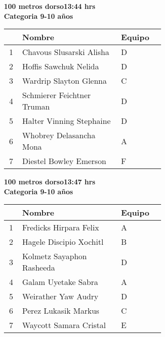 \begin{minipage}{0.95\linewidth}\vspace{0.5cm} 
\begin{flushleft}
\textbf{
\hspace{-0.15cm}100 metros dorso\hspace{1.5cm}13:44 hrs \\Categoria 9-10 años}\vspace{-0.2cm} 
\end{flushleft}
\begin{tabular}{cp{0.63\linewidth}l}
\hline
& \textbf{Nombre} & \textbf{Equipo} \\ \hline
1 & Chavous Slusarski Alisha & D \\ 
2 & Hoffis Sawchuk Nelida & D \\ 
3 & Wardrip Slayton Glenna & C \\ 
4 & Schmierer Feichtner Truman & D \\ 
5 & Halter Vinning Stephaine & D \\ 
6 & Whobrey Delasancha Mona & A \\ 
7 & Diestel Bowley Emerson & F \\ 
\end{tabular}
\end{minipage}
\begin{minipage}{0.95\linewidth}\vspace{0.5cm} 
\begin{flushleft}
\textbf{
\hspace{-0.15cm}100 metros dorso\hspace{1.5cm}13:47 hrs \\Categoria 9-10 años}\vspace{-0.2cm} 
\end{flushleft}
\begin{tabular}{cp{0.63\linewidth}l}
\hline
& \textbf{Nombre} & \textbf{Equipo} \\ \hline
1 & Fredicks Hirpara Felix & A \\ 
2 & Hagele Discipio Xochitl & B \\ 
3 & Kolmetz Sayaphon Rasheeda & D \\ 
4 & Galam Uyetake Sabra & A \\ 
5 & Weirather Yaw Audry & D \\ 
6 & Perez Lukasik Markus & C \\ 
7 & Waycott Samara Cristal & E \\ 
\end{tabular}
\end{minipage}
